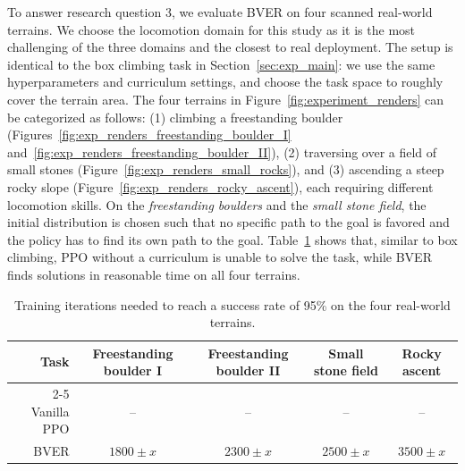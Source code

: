 To answer research question 3, we evaluate BVER on four scanned real-world terrains. We choose the locomotion domain for this study as it is the most challenging of the three domains and the closest to real deployment. The setup is identical to the box climbing task in Section~\ref{sec:exp_main}: we use the same hyperparameters and curriculum settings, and choose the task space to roughly cover the terrain area. The four terrains in Figure~\ref{fig:experiment_renders} can be categorized as follows: (1) climbing a freestanding boulder (Figures~\ref{fig:exp_renders_freestanding_boulder_I} and~\ref{fig:exp_renders_freestanding_boulder_II}), (2) traversing over a field of small stones (Figure~\ref{fig:exp_renders_small_rocks}), and (3) ascending a steep rocky slope (Figure~\ref{fig:exp_renders_rocky_ascent}), each requiring different locomotion skills. On the \textit{freestanding boulders} and the \textit{small stone field}, the initial distribution is chosen such that no specific path to the goal is favored and the policy has to find its own path to the goal. Table~\ref{tab:real_world_results} shows that, similar to box climbing, PPO without a curriculum is unable to solve the task, while BVER finds solutions in reasonable time on all four terrains.
\begin{table}[h]
    \centering
    \caption{Training iterations needed to reach a success rate of 95\% on the four real-world terrains.}\label{tab:real_world_results}
    \begin{tabularx}{\linewidth}{@{}rcccc@{}}
        \bf Task    & Freestanding boulder I & Freestanding boulder II & Small stone field & Rocky ascent \\
        \cmidrule{2-5}
        Vanilla PPO & --                     & --                      & --                & --           \\
        BVER        & $1800\pm x$            & $2300\pm x$             & $2500\pm x$       & $3500\pm x$  \\
    \end{tabularx}
\end{table}

